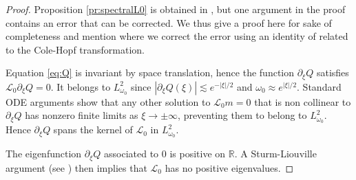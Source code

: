\documentclass[11pt]{aims}
\theoremstyle{definition}
\newcommand{\Ls}{\mathscr{L}}
\newcommand{\pa}{\partial}
\numberwithin{equation}{section}
\begin{document}
\begin{proof} Proposition \ref{pr:spectralL0} is obtained in \cite{Sam76}, but one argument in the proof contains an error that can be corrected. We thus give a proof here for sake of completeness and mention where we correct the error using an identity of \cite{Njjam85} related to the Cole-Hopf transformation.

Equation \eqref{eq:Q} is invariant by space translation, hence the function $\pa_\xi Q$ satisfies $\Ls_0 \pa_\xi Q=0$. It belongs to $L^2_{\omega_0}$ since $|\pa_\xi Q(\xi)|\lesssim e^{-|\xi|/2}$ and $\omega_0\approx e^{|\xi|/2}$. Standard ODE arguments show that any other solution to $\Ls_0 m=0$ that is non collinear to $\pa_\xi Q$ has nonzero finite limits as $\xi \rightarrow \pm \infty$, preventing them to belong to $L^2_{\omega_0}$. Hence $\pa_\xi Q$ spans the kernel of $\Ls_0$ in $L^2_{\omega_0}$.

The eigenfunction $\pa_\xi Q$ associated to $0$ is positive on $\mathbb R$. A Sturm-Liouville argument (see \cite{Sam76}) then implies that $\Ls_0$ has no positive eigenvalues.


\end{proof}
\end{document}
